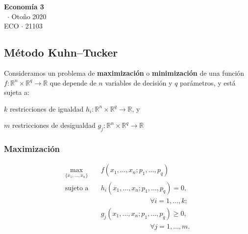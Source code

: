 \documentclass[8pt,a4paper]{extarticle}
\renewcommand{\csClass}{Economía 3}
\renewcommand{\csClassCode}{ECO $\cdot$ 21103}
\renewcommand{\csTerm}{Otoño 2020}
\begin{document}
\begin{titlepage}
	\begin{center}
		\vspace*{1cm}
		\Huge
		\textbf{\csClass}
		\vspace{0.5cm} \\
		\Large
		\cs\ $\cdot$ \csTerm
		\vfill
		\csAuthorName\\
		\vspace{0.8cm}
		\csClassCode\\
		\csSchool
	\end{center}
\end{titlepage}

\begin{multicols}{3}
	\setcounter{page}{1}

	\section*{Método Kuhn–Tucker}

	Consideramos un problema de \textbf{maximización} o \textbf{minimización} de una función $f : \mathbb{R}^n \times \mathbb{R}^q \to \mathbb{R}$ que depende de $n$ variables de decisión y $q$ parámetros, y está sujeta a:

	\begin{bulletlist}
		\item $k$ restricciones de igualdad $h_i : \mathbb{R}^n \times \mathbb{R}^q \to \mathbb{R}$, y
		\item $m$ restricciones de desigualdad $g_j : \mathbb{R}^n \times \mathbb{R}^q \to \mathbb{R}$
	\end{bulletlist}

	\subsubsection*{Maximización}

	\begin{equation*}
		\begin{aligned}
			\max_{\{x_1, \ldots, x_n\}}\  & f(x_1, \ldots, x_n; p_1, \ldots, p_q)          \\
			\text{sujeto a} \quad         & h_i(x_1, \ldots, x_n; p_1, \ldots, p_q) = 0,   \\ & \qquad \qquad \qquad \quad \, \forall i = 1, \ldots, k; \\
			                              & g_j(x_1, \ldots, x_n; p_1, \ldots, p_q) \ge 0, \\ & \qquad \qquad \qquad \quad \, \forall j = 1, \ldots, m.
		\end{aligned}
	\end{equation*}


\end{multicols}
\end{document}
